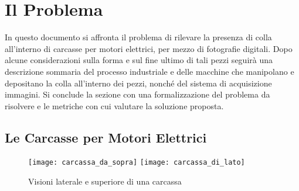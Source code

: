 
\chapter{Il Problema}



In questo documento si affronta il problema di rilevare la presenza di colla all'interno di carcasse per motori elettrici, per mezzo di fotografie digitali.
Dopo alcune considerazioni sulla forma e sul fine ultimo di tali pezzi seguirà una descrizione sommaria del processo industriale e delle macchine che manipolano e depositano la colla all'interno dei pezzi, nonché del sistema di acquisizione immagini.
Si conclude la sezione con una formalizzazione del problema da risolvere e le metriche con cui valutare la soluzione proposta.

\section{Le Carcasse per Motori Elettrici}

\begin{figure}[h]
  \texttt{[image: carcassa\_da\_sopra]}
  \texttt{[image: carcassa\_di\_lato]}
  \caption{Visioni laterale e superiore di una carcassa}
  \label{fig:carc}
\end{figure}


